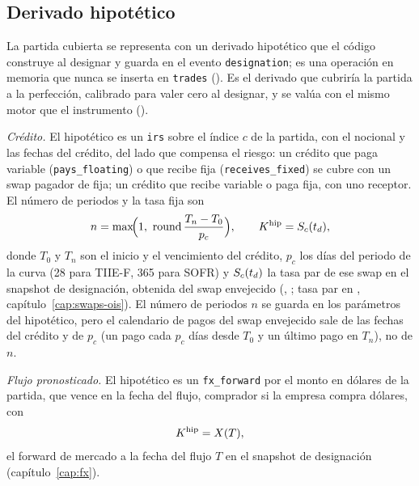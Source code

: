 \subsection{Derivado hipotético}\label{sec:cap10-hipotetico}

La partida cubierta se representa con un derivado hipotético que el código construye al designar y guarda en el evento
\texttt{designation}; es una operación en memoria que nunca se inserta en \texttt{trades}
(). Es el derivado que cubriría la partida a la perfección, calibrado para
valer cero al designar, y se valúa con el mismo motor que el instrumento
().

\emph{Crédito.} El hipotético es un \texttt{irs} sobre el índice $c$ de la partida, con el nocional y las fechas del
crédito, del lado que compensa el riesgo: un crédito que paga variable (\texttt{pays\_floating}) o que recibe fija
(\texttt{receives\_fixed}) se cubre con un swap pagador de fija; un crédito que recibe variable o paga fija, con uno
receptor. El número de periodos y la tasa fija son
\begin{equation}\label{eq:cap10-hipotetico-credito}
  n = \max\!\Bigl(1,\ \operatorname{round}\frac{T_n - T_0}{p_c}\Bigr), \qquad
  K^{\mathrm{hip}} = S_c(t_d),
\end{equation}
donde $T_0$ y $T_n$ son el inicio y el vencimiento del crédito, $p_c$ los días del periodo de la curva (28 para TIIE-F,
365 para SOFR) y $S_c(t_d)$ la tasa par de ese swap en el snapshot de designación, obtenida del swap envejecido
(, ;
tasa par en , capítulo~\ref{cap:swaps-ois}). El número de periodos $n$
se guarda en los parámetros del hipotético, pero el calendario de pagos del swap envejecido sale de las fechas del
crédito y de $p_c$ (un pago cada $p_c$ días desde $T_0$ y un último pago en $T_n$), no de $n$.

\emph{Flujo pronosticado.} El hipotético es un \texttt{fx\_forward} por el monto en dólares de la partida, que vence
en la fecha del flujo, comprador si la empresa compra dólares, con
\begin{equation}\label{eq:cap10-hipotetico-forward}
  K^{\mathrm{hip}} = X(T),
\end{equation}
el forward de mercado a la fecha del flujo $T$ en el snapshot de designación (capítulo~\ref{cap:fx}).

